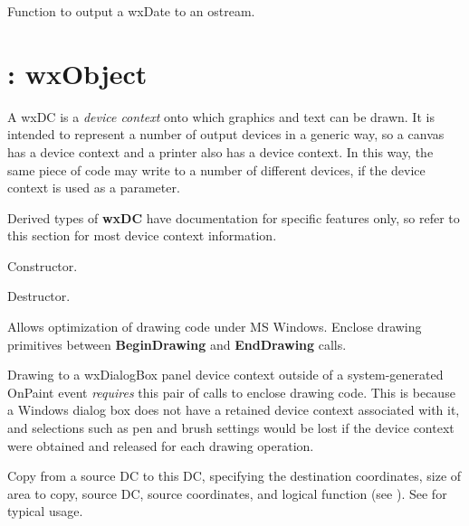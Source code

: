 Function to output a wxDate to an ostream.

\section{: wxObject}\label{wxdc}


A wxDC is a {\it device context} onto which graphics and text can be drawn.
It is intended to represent a number of output devices in a generic way,
so a canvas has a device context and a printer also has a device context.
In this way, the same piece of code may write to a number of different devices,
if the device context is used as a parameter.

Derived types of {\bf wxDC} have documentation for specific features
only, so refer to this section for most device context information.



Constructor.



Destructor.



Allows optimization of drawing code under MS Windows. Enclose
drawing primitives between {\bf BeginDrawing} and {\bf EndDrawing}\rtfsp
calls.

Drawing to a wxDialogBox panel device context outside of a
system-generated OnPaint event {\it requires} this pair of calls to
enclose drawing code. This is because a Windows dialog box does not have
a retained device context associated with it, and selections such as pen
and brush settings would be lost if the device context were obtained and
released for each drawing operation.

\label{wxdcblit}


Copy from a source DC to this DC, specifying the destination
coordinates, size of area to copy, source DC, source coordinates, and
logical function (see ).
See  for typical usage.

